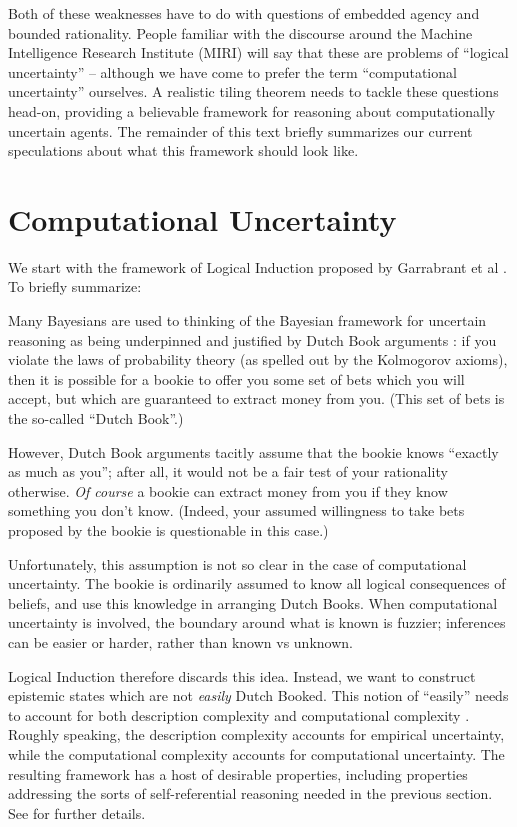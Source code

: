 \documentclass{article}
\begin{document}
Both of these weaknesses have to do with questions of embedded agency \cite{demski2019embedded} and bounded rationality. People familiar with the discourse around the Machine Intelligence Research Institute (MIRI) will say that these are problems of ``logical uncertainty'' -- although we have come to prefer the term ``computational uncertainty'' ourselves. A realistic tiling theorem needs to tackle these questions head-on, providing a believable framework for reasoning about computationally uncertain agents. The remainder of this text briefly summarizes our current speculations about what this framework should look like.

\section{Computational Uncertainty}

We start with the framework of Logical Induction proposed by Garrabrant et al \cite{garrabrant2016logical}. To briefly summarize:

Many Bayesians are used to thinking of the Bayesian framework for uncertain reasoning as being underpinned and justified by Dutch Book arguments \cite{sep-dutch-book}: if you violate the laws of probability theory (as spelled out by the Kolmogorov axioms), then it is possible for a bookie to offer you some set of bets which you will accept, but which are guaranteed to extract money from you. (This set of bets is the so-called ``Dutch Book''.)

However, Dutch Book arguments tacitly assume that the bookie knows ``exactly as much as you''; after all, it would not be a fair test of your rationality otherwise. \emph{Of course} a bookie can extract money from you if they know something you don't know. (Indeed, your assumed willingness to take bets proposed by the bookie is questionable in this case.)

Unfortunately, this assumption is not so clear in the case of computational uncertainty. The bookie is ordinarily assumed to know all logical consequences of beliefs, and use this knowledge in arranging Dutch Books. When computational uncertainty is involved, the boundary around what is known is fuzzier; inferences can be easier or harder, rather than known vs unknown.

Logical Induction therefore discards this idea. Instead, we want to construct epistemic states which are not \emph{easily} Dutch Booked. This notion of ``easily'' needs to account for both description complexity \cite{ming1990kolmogorov} and computational complexity \cite{boolos2002computability}. Roughly speaking, the description complexity accounts for empirical uncertainty, while the computational complexity accounts for computational uncertainty. The resulting framework has a host of desirable properties, including properties addressing the sorts of self-referential reasoning needed in the previous section. See \cite{garrabrant2016logical} for further details.
\end{document}
